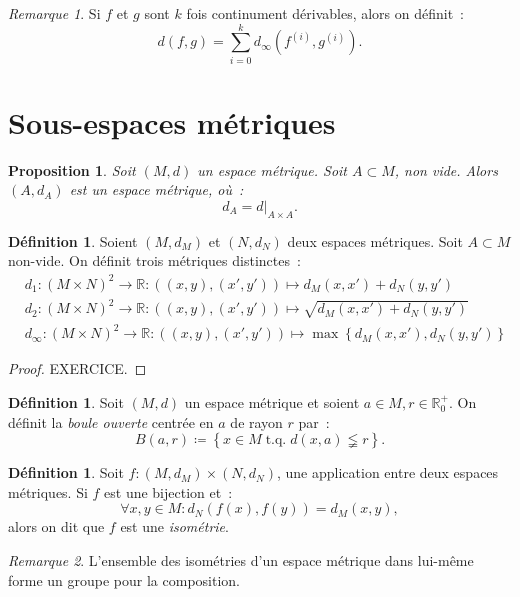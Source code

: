 \documentclass{report}
\newtheorem{prp}[thm]{Proposition}
\theoremstyle{definition}
\newtheorem{déf}[thm]{Définition}
\theoremstyle{remark}
\newtheorem*{rmq}{Remarque}
\DeclareMathOperator{\tq}{\text{ t.q. }}
\newcommand{\restr}[2]{\left.#1\right|_{#2}}
\newcommand{\R}{\mathbb R}
\begin{document}
		\begin{rmq} Si $f$ et $g$ sont $k$ fois continument dérivables, alors on définit~:
		\[d(f, g) = \sum_{i=0}^kd_\infty(f^{(i)}, g^{(i)}).\]
		\end{rmq}

	\section{Sous-espaces métriques}
		\begin{prp} Soit $(M, d)$ un espace métrique. Soit $A \subset M$, non vide. Alors $(A, d_A)$ est un espace métrique, où~:
		\[d_A = \restr d{A \times A}.\]
		\end{prp}

		\begin{déf} Soient $(M, d_M)$ et $(N, d_N)$ deux espaces métriques. Soit $A \subset M$ non-vide. On définit trois métriques distinctes~:
		\begin{align*}
			&d_1 : (M \times N)^2 \to \R : ((x, y), (x', y')) \mapsto d_M(x, x') + d_N(y, y') \\
			&d_2 : (M \times N)^2 \to \R : ((x, y), (x', y')) \mapsto \sqrt {d_M(x, x') + d_N(y, y')} \\
			&d_\infty : (M \times N)^2 \to \R : ((x, y), (x', y')) \mapsto \max\left\{d_M(x, x'), d_N(y, y')\right\}
		\end{align*}
		\end{déf}

		\begin{proof} EXERCICE.
		\end{proof}

		\begin{déf} Soit $(M, d)$ un espace métrique et soient $a \in M, r \in \R^+_0$. On définit la \textit{boule ouverte} centrée en $a$ de rayon $r$ par~:
		\[B(a, r) \coloneqq \left\{x \in M \tq d(x, a) \lneqq r\right\}.\]
		\end{déf}

		\begin{déf} Soit $f : (M, d_M) \times (N, d_N)$, une application entre deux espaces métriques. Si $f$ est une bijection et~:
		\[\forall x, y \in M : d_N(f(x), f(y)) = d_M(x, y),\]
		alors on dit que $f$ est une \textit{isométrie}. \end{déf}

		\begin{rmq} L'ensemble des isométries d'un espace métrique dans lui-même forme un groupe pour la composition. \end{rmq}
\end{document}
